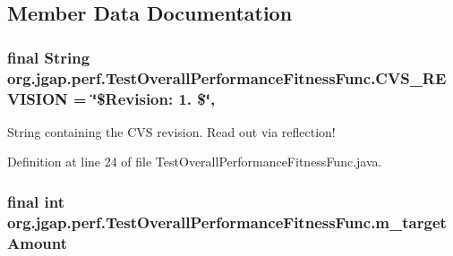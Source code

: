 \subsection{Member Data Documentation}
\hypertarget{classorg_1_1jgap_1_1perf_1_1_test_overall_performance_fitness_func_a777b1a23fbd36b31a3929f36bae39519}{
\subsubsection[{C\-V\-S\-\_\-\-R\-E\-V\-I\-S\-I\-O\-N}]{\setlength{\rightskip}{0pt plus 5cm}final String org.\-jgap.\-perf.\-Test\-Overall\-Performance\-Fitness\-Func.\-C\-V\-S\-\_\-\-R\-E\-V\-I\-S\-I\-O\-N = \char`\"{}\$Revision\-: 1. \$\char`\"{}\hspace{0.3cm}{\ttfamily [static]}, {\ttfamily [private]}}}\label{classorg_1_1jgap_1_1perf_1_1_test_overall_performance_fitness_func_a777b1a23fbd36b31a3929f36bae39519}
String containing the C\-V\-S revision. Read out via reflection! 

Definition at line 24 of file Test\-Overall\-Performance\-Fitness\-Func.\-java.

\hypertarget{classorg_1_1jgap_1_1perf_1_1_test_overall_performance_fitness_func_a167b089eeb152efef50d2bdcc94853ee}{
\subsubsection[{m\-\_\-target\-Amount}]{\setlength{\rightskip}{0pt plus 5cm}final int org.\-jgap.\-perf.\-Test\-Overall\-Performance\-Fitness\-Func.\-m\-\_\-target\-Amount\hspace{0.3cm}{\ttfamily [private]}}}\label{classorg_1_1jgap_1_1perf_1_1_test_overall_performance_fitness_func_a167b089eeb152efef50d2bdcc94853ee}


